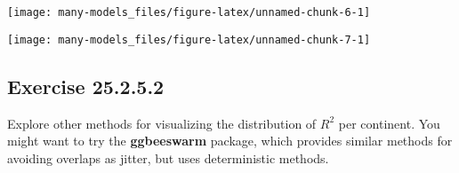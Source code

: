 \documentclass[]{book}
\newenvironment{Shaded}{\begin{snugshade}}{\end{snugshade}}
\newcommand{\CommentTok}[1]{\textcolor[rgb]{0.56,0.35,0.01}{\textit{#1}}}
\newcommand{\DataTypeTok}[1]{\textcolor[rgb]{0.13,0.29,0.53}{#1}}
\newcommand{\DecValTok}[1]{\textcolor[rgb]{0.00,0.00,0.81}{#1}}
\newcommand{\FloatTok}[1]{\textcolor[rgb]{0.00,0.00,0.81}{#1}}
\newcommand{\KeywordTok}[1]{\textcolor[rgb]{0.13,0.29,0.53}{\textbf{#1}}}
\newcommand{\NormalTok}[1]{#1}
\newcommand{\OperatorTok}[1]{\textcolor[rgb]{0.81,0.36,0.00}{\textbf{#1}}}
\newcommand{\OtherTok}[1]{\textcolor[rgb]{0.56,0.35,0.01}{#1}}
\newcommand{\StringTok}[1]{\textcolor[rgb]{0.31,0.60,0.02}{#1}}
\theoremstyle{plain}
\theoremstyle{remark}
\begin{document}
\begin{Shaded}
\end{Shaded}

\begin{center}\texttt{[image: many-models\_files/figure-latex/unnamed-chunk-6-1]} \end{center}

\begin{Shaded}
\end{Shaded}

\begin{center}\texttt{[image: many-models\_files/figure-latex/unnamed-chunk-7-1]} \end{center}

\hypertarget{exercise-25.2.5.2}{%
\subsection*{\texorpdfstring{Exercise
{25.2.5.2}}{Exercise 25.2.5.2}}\label{exercise-25.2.5.2}}

Explore other methods for visualizing the distribution of \(R^2\) per
continent. You might want to try the \textbf{ggbeeswarm} package, which
provides similar methods for avoiding overlaps as jitter, but uses
deterministic methods.
\end{document}
